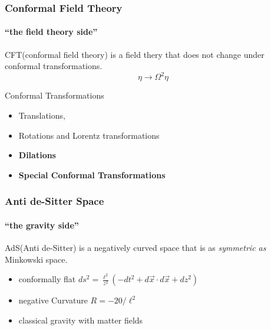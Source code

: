 \documentclass[xcolor=dvipsnames]{beamer}
\begin{document}
\begin{frame}
  \frametitle{Conformal Field Theory}
  \framesubtitle{``the field theory side''}
  \begin{block}{}
    \alert{CFT}(conformal field theory) is a field thery that does not change under conformal transformations.
    $$\eta \rightarrow \Omega^2 \eta$$
  \end{block}

  \begin{block}{Conformal Transformations}
    \begin{itemize}
      \item Translations, 
      \item Rotations and Lorentz transformations
      \item \textbf{Dilations}
      \item \textbf{Special Conformal Transformations}
    \end{itemize}
  \end{block}

\end{frame}

\begin{frame}
  \frametitle{Anti de-Sitter Space}
  \framesubtitle{``the gravity side''}

  \begin{block}{}
    \alert{AdS}(Anti de-Sitter) is a negatively curved space that is as \textit{symmetric as} Minkowski space.
  \end{block}

  \begin{itemize}
    \item conformally flat 
      $ds^2 = \frac {\ell^2}{z^2} \left( -dt^2 + d\vec x\cdot d\vec x + dz^2 \right)$
    \item negative Curvature 
      $R = -20/\ell^2$
    \item classical gravity with matter fields
  \end{itemize}


\end{frame}

\end{document}
